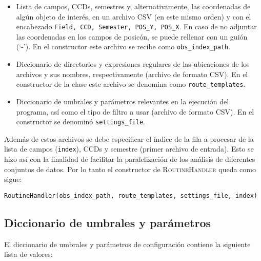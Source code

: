 \begin{itemize}
\item Lista de campos, CCDs, semestres y, alternativamente, las coordenadas de alg\'un objeto de inter\'es, en un archivo CSV (en este mismo orden) y con el encabezado \texttt{Field, CCD, Semester, POS\_Y, POS\_X}. En caso de no adjuntar las coordenadas en los campos de posic\'on, se puede rellenar con un gui\'on (`-'). En el constructor este archivo se recibe como \texttt{obs\_index\_path}.
\item Diccionario de directorios y expresiones regulares de las ubicaciones de los archivos y sus nombres, respectivamente (archivo de formato CSV). En el constructor de la clase este archivo se denomina como \texttt{route\_templates}.
\item Diccionario de umbrales y par\'ametros relevantes en la ejecuci\'on del programa, as\'i como el tipo de filtro a usar (archivo de formato CSV). En el constructor se denomin\'o \texttt{settings\_file}.
\end{itemize}
\bigskip
Adem\'as de estos archivos se debe especificar el \'indice de la fila a procesar de la lista de campos (\texttt{index}), CCDs y semestre (primer archivo de entrada). Esto se hizo as\'i con la finalidad de facilitar la paralelizaci\'on de los an\'alisis de diferentes conjuntos de datos. Por lo tanto el constructor de \textsc{RoutineHandler} queda como sigue:

\begin{center}
\texttt{RoutineHandler(obs\_index\_path, route\_templates, settings\_file, index)}
\end{center}

\subsection{Diccionario de umbrales y par\'ametros}
El diccionario de umbrales y par\'ametros de configuraci\'on contiene la siguiente lista de valores:

